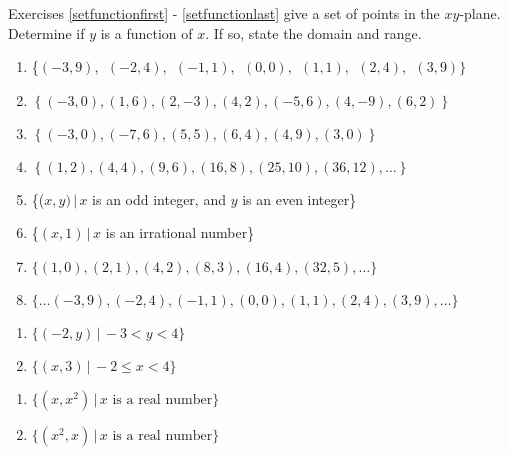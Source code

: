 \documentclass{ximera}
\begin{document}
Exercises \ref{setfunctionfirst} - \ref{setfunctionlast} give a set of points in the $xy$-plane.    Determine if $y$ is a function of $x$.  If so, state the domain and range.

\begin{enumerate}

\setcounter{enumi}{\value{HW}}

\item \{$(-3, 9)$, $\;(-2, 4)$, $\;(-1, 1)$, $\;(0, 0)$, $\;(1, 1)$, $\;(2, 4)$, $\;(3, 9)\}$ \label{setfunctionfirst}
\item  $\left\{ (-3,0), (1,6), (2, -3), (4,2), (-5,6), (4, -9), (6,2) \right\}$
\item  $\left\{ (-3,0), (-7,6), (5,5), (6,4), (4,9), (3,0) \right\}$
\item  $\left\{ (1,2), (4,4), (9,6), (16,8), (25,10), (36, 12), \ldots \right\}$
\item \{($x, y) \, | \, x$ is an odd integer, and $y$ is an even integer\}
\item \{$(x, 1) \, | \, x$ is an irrational number\}

\item $\{ (1,0), (2,1), (4,2), (8,3), (16,4), (32, 5), \ldots \}$
\item $\{ \ldots (-3,9), (-2,4), (-1,1), (0,0), (1,1), (2,4), (3,9), \ldots \}$

\setcounter{HW}{\value{enumi}}
\end{enumerate}

\vspace{-0.1in}

\begin{multicols}{2}
\begin{enumerate}
\setcounter{enumi}{\value{HW}}

\item $\{ (-2, y) \, | \, -3 < y < 4\}$
\item  $\{ (x,3) \, | \,  -2 \leq x < 4\}$

\setcounter{HW}{\value{enumi}}
\end{enumerate}
\end{multicols}

\begin{multicols}{2}
\begin{enumerate}
\setcounter{enumi}{\value{HW}}


\item  $\{ \left(x,x^2\right) \, | \, \text{$x$ is a real number} \}$
\item  $\{ \left(x^2,x\right) \, | \, \text{$x$ is a real number} \}$ \label{setfunctionlast}

\setcounter{HW}{\value{enumi}}
\end{enumerate}
\end{multicols}
\end{document}
